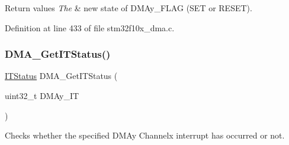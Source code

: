 \begin{DoxyRetVals}{Return values}
{\em The} & new state of D\+M\+Ay\+\_\+\+F\+L\+AG (S\+ET or R\+E\+S\+ET). \\
\hline
\end{DoxyRetVals}


Definition at line 433 of file stm32f10x\+\_\+dma.\+c.

\mbox{\label{group___d_m_a___exported___functions_ga9287331247150fe84d03ecd7ad8adb52}} 
\subsubsection{\texorpdfstring{D\+M\+A\+\_\+\+Get\+I\+T\+Status()}{DMA\_GetITStatus()}}
{\footnotesize\ttfamily \hyperlink{group___exported__types_gaacbd7ed539db0aacd973a0f6eca34074}{I\+T\+Status} D\+M\+A\+\_\+\+Get\+I\+T\+Status (\begin{DoxyParamCaption}\item[{uint32\+\_\+t}]{D\+M\+Ay\+\_\+\+IT }\end{DoxyParamCaption})}



Checks whether the specified D\+M\+Ay Channelx interrupt has occurred or not. 


